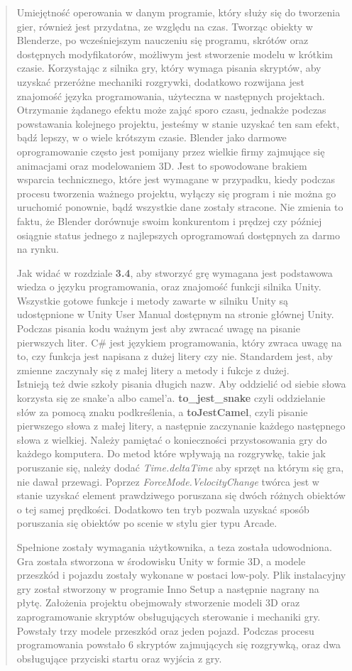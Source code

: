 \begin{quotation}
\indent Umiejętność operowania w danym programie, który służy się do tworzenia gier, również jest przydatna, ze względu na czas. Tworząc obiekty w Blenderze, po wcześniejszym nauczeniu się programu, skrótów oraz dostępnych modyfikatorów, możliwym jest stworzenie modelu w krótkim czasie. Korzystając z silnika gry, który wymaga pisania skryptów, aby uzyskać przeróżne mechaniki rozgrywki, dodatkowo rozwijana jest znajomość języka programowania, użyteczna w następnych projektach. Otrzymanie żądanego efektu może zająć sporo czasu, jednakże podczas powstawania kolejnego projektu, jesteśmy w stanie uzyskać ten sam efekt, bądź lepszy, w o wiele krótszym czasie. Blender jako darmowe oprogramowanie często jest pomijany przez wielkie firmy zajmujące się animacjami oraz modelowaniem 3D. Jest to spowodowane brakiem wsparcia technicznego, które jest wymagane w przypadku, kiedy podczas procesu tworzenia ważnego projektu, wyłączy się program i nie można go uruchomić ponownie, bądź wszystkie dane zostały stracone. Nie zmienia to faktu, że Blender dorównuje swoim konkurentom i prędzej czy później osiągnie status jednego z najlepszych oprogramowań dostępnych za darmo na rynku.

\indent Jak widać w rozdziale \textbf{3.4}, aby stworzyć grę wymagana jest podstawowa wiedza o języku programowania, oraz znajomość funkcji silnika Unity. Wszystkie gotowe funkcje i metody zawarte w silniku Unity są udostępnione w Unity User Manual dostępnym na stronie głównej Unity. Podczas pisania kodu ważnym jest aby zwracać uwagę na pisanie pierwszych liter. C\# jest językiem programowania, który zwraca uwagę na to, czy funkcja jest napisana z dużej litery czy nie. Standardem jest, aby zmienne zaczynały się z małej litery a metody i fukcje z dużej. \\
Istnieją też dwie szkoły pisania długich nazw. Aby oddzielić od siebie słowa korzysta się ze snake'a albo camel'a. \textbf{to\_jest\_snake} czyli oddzielanie słów za pomocą znaku podkreślenia, a \textbf{toJestCamel}, czyli pisanie pierwszego słowa z małej litery, a następnie zaczynanie każdego następnego słowa z wielkiej. 
\indent Należy pamiętać o konieczności przystosowania gry do każdego komputera. Do metod które wpływają na rozgrywkę, takie jak poruszanie się, należy dodać \textit{Time.deltaTime} aby sprzęt na którym się gra, nie dawał przewagi. Poprzez \textit{ForceMode.VelocityChange} twórca jest w stanie uzyskać element prawdziwego poruszana się dwóch różnych obiektów o tej samej prędkości. Dodatkowo ten tryb pozwala uzyskać sposób poruszania się obiektów po scenie w stylu gier typu Arcade.

\indent Spełnione zostały wymagania użytkownika, a teza została udowodniona. Gra została stworzona w środowisku Unity w formie 3D, a modele przeszkód i pojazdu zostały wykonane w postaci low-poly. Plik instalacyjny gry został stworzony w programie Inno Setup a następnie nagrany na płytę. Założenia projektu obejmowały stworzenie modeli 3D oraz zaprogramowanie skryptów obsługujących sterowanie i mechaniki gry. Powstały trzy modele przeszkód oraz jeden pojazd. Podczas procesu programowania powstało 6 skryptów zajmujących się rozgrywką, oraz dwa obsługujące przyciski startu oraz wyjścia z gry. 
\end{quotation}
